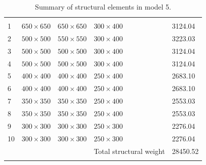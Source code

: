 \documentclass{cup-pan}
\begin{document}
\renewcommand{\arraystretch}{1}
\begin{longtable}{P{0.5in} P{1in} P{1in} P{1in} P{1in}}
\caption{Summary of structural elements in model 5.}\\
\headrow {} &  &  &  &  \\
1 & $650 \times 650$ & $650 \times 650$ & $300 \times 400$ & \num{3124.04} \\
2 & $500 \times 500$ & $550 \times 550$ & $300 \times 400$ & \num{3223.03} \\
3 & $500 \times 500$ & $500 \times 500$ & $300 \times 400$ & \num{3124.04} \\
4 & $500 \times 500$ & $500 \times 500$ & $300 \times 400$ & \num{3124.04} \\
5 & $400 \times 400$ & $400 \times 400$ & $250 \times 400$ & \num{2683.10} \\
6 & $400 \times 400$ & $400 \times 400$ & $250 \times 400$ & \num{2683.10} \\
7 & $350 \times 350$ & $350 \times 350$ & $250 \times 400$ & \num{2553.03} \\
8 & $350 \times 350$ & $350 \times 350$ & $250 \times 400$ & \num{2553.03} \\
9 & $300 \times 300$ & $300 \times 300$ & $250 \times 300$ & \num{2276.04} \\
10 & $300 \times 300$ & $300 \times 300$ & $250 \times 300$ & \num{2276.04} \\
 &  & & Total structural weight & \num{28450.52} \\
\label{tab:cross section model 5}
\end{longtable}
\end{document}
